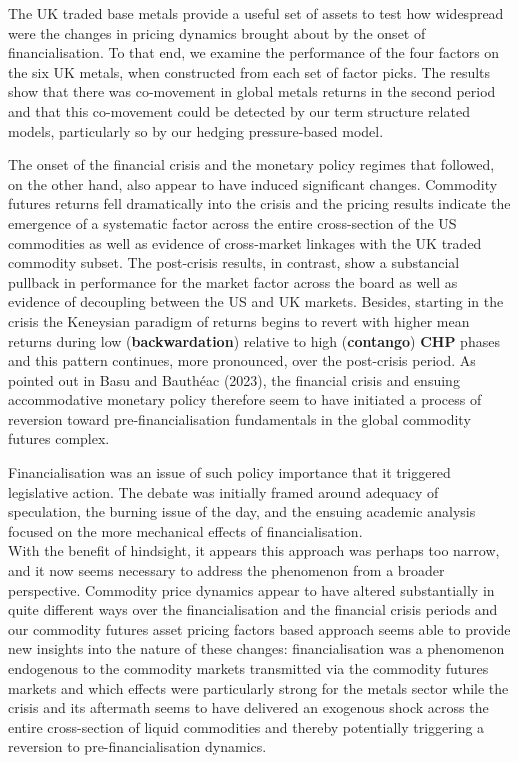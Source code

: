 \documentclass[]{elsarticle} %
\begin{document}
\medskip\setlength{\parindent}{0pt}

The UK traded base metals provide a useful set of assets to test how widespread were the changes in pricing dynamics brought about by the onset of financialisation. To that end, we examine the performance of the four factors on the six UK metals, when constructed from each set of factor picks. The results show that there was co-movement in global metals returns in the second period and that this co-movement could be detected by our term structure related models, particularly so by our hedging pressure-based model.

\medskip\setlength{\parindent}{0pt}

The onset of the financial crisis and the monetary policy regimes that followed, on the other hand, also appear to have induced significant changes. Commodity futures returns fell dramatically into the crisis and the pricing results indicate the emergence of a systematic factor across the entire cross-section of the US commodities as well as evidence of cross-market linkages with the UK traded commodity subset. The post-crisis results, in contrast, show a substancial pullback in performance for the market factor across the board as well as evidence of decoupling between the US and UK markets. Besides, starting in the crisis the Keneysian paradigm of returns begins to revert with higher mean returns during low (\textbf{backwardation}) relative to high (\textbf{contango}) \textbf{CHP} phases and this pattern continues, more pronounced, over the post-crisis period. As pointed out in Basu and Bauthéac (2023), the financial crisis and ensuing accommodative monetary policy therefore seem to have initiated a process of reversion toward pre-financialisation fundamentals in the global commodity futures complex.

\bigskip\bigskip\setlength{\parindent}{0pt}

Financialisation was an issue of such policy importance that it triggered legislative action. The debate was initially framed around adequacy of speculation, the burning issue of the day, and the ensuing academic analysis focused on the more mechanical effects of financialisation.\\
With the benefit of hindsight, it appears this approach was perhaps too narrow, and it now seems necessary to address the phenomenon from a broader perspective. Commodity price dynamics appear to have altered substantially in quite different ways over the financialisation and the financial crisis periods and our commodity futures asset pricing factors based approach seems able to provide new insights into the nature of these changes: financialisation was a phenomenon endogenous to the commodity markets transmitted via the commodity futures markets and which effects were particularly strong for the metals sector while the crisis and its aftermath seems to have delivered an exogenous shock across the entire cross-section of liquid commodities and thereby potentially triggering a reversion to pre-financialisation dynamics.
\end{document}
